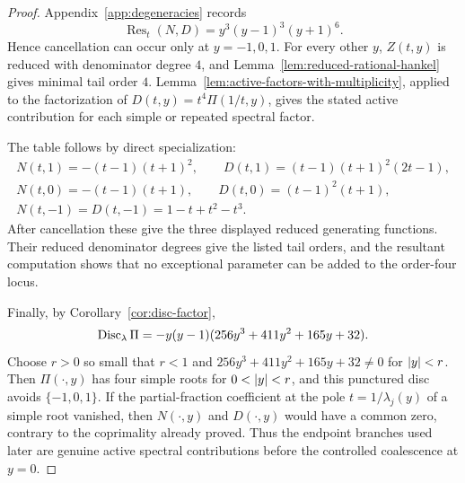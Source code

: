 \begin{proof}
Appendix~\ref{app:degeneracies} records
\begin{equation}\label{eq:ND-resultant}
\operatorname{Res}_t(N,D)=y^3(y-1)^3(y+1)^6.
\end{equation}
Hence cancellation can occur only at \(y=-1,0,1\).
For every other \(y\), \(Z(t,y)\) is reduced with denominator degree \(4\), and Lemma~\ref{lem:reduced-rational-hankel} gives minimal tail order \(4\).  Lemma~\ref{lem:active-factors-with-multiplicity}, applied to the factorization of \(D(t,y)=t^4\Pi(1/t,y)\), gives the stated active contribution for each simple or repeated spectral factor.

The table follows by direct specialization:
\[
\begin{gathered}
N(t,1)=-(t-1)(t+1)^2,
\qquad
D(t,1)=(t-1)(t+1)^2(2t-1),\\
N(t,0)=-(t-1)(t+1),
\qquad
D(t,0)=(t-1)^2(t+1),\\
N(t,-1)=D(t,-1)=1-t+t^2-t^3.
\end{gathered}
\]
After cancellation these give the three displayed reduced generating functions.
Their reduced denominator degrees give the listed tail orders, and the resultant computation shows that no exceptional parameter can be added to the order-four locus.

Finally, by Corollary~\ref{cor:disc-factor},
\[
\operatorname{Disc}_\lambda \Pi=-y(y-1)(256y^3+411y^2+165y+32).
\]
Choose \(r>0\) so small that \(r<1\) and \(256y^3+411y^2+165y+32\ne0\) for \(\left\lvert y\right\rvert<r\).
Then \(\Pi(\cdot,y)\) has four simple roots for \(0<\left\lvert y\right\rvert<r\), and this punctured disc avoids \(\{-1,0,1\}\).
If the partial-fraction coefficient at the pole \(t=1/\lambda_j(y)\) of a simple root vanished, then \(N(\cdot,y)\) and \(D(\cdot,y)\) would have a common zero, contrary to the coprimality already proved.
Thus the endpoint branches used later are genuine active spectral contributions before the controlled coalescence at \(y=0\).
\end{proof}

